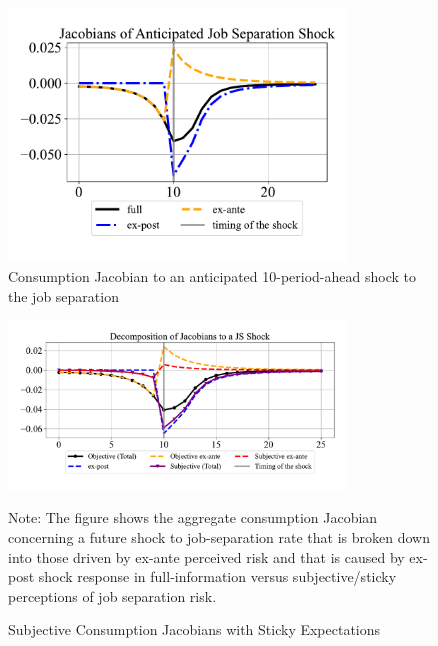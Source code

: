 \begin{figure}[pt]
    \centering
    \caption{Consumption Jacobian to an anticipated 10-period-ahead shock to the job separation}
    \label{fig:jac_decompose}
\includegraphics[width=0.8\textwidth]{text/chapter2/Figures/JS_decomposition.pdf} 
\end{figure}


\begin{figure}[pt]
    \centering
    \caption{Subjective Consumption Jacobians with Sticky Expectations}
    \label{fig:jac_decompose_sub}
\includegraphics[width=0.8\textwidth]{text/chapter2/Figures/JS_decomposition_subjective.pdf} 
\begin{flushleft}\footnotesize {Note: The figure shows the aggregate consumption Jacobian concerning a future shock to job-separation rate that is broken down into those driven by ex-ante perceived risk and that is caused by ex-post shock response in full-information versus subjective/sticky perceptions of job separation risk.} \end{flushleft}
\end{figure}



